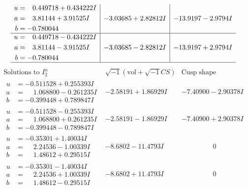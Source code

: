 \documentclass[1p]{elsarticle_modified}
\theoremstyle{definition}
\newcommand{\I}{\sqrt{-1}}
\begin{document}
$$\begin{array}{c|c|c}
\begin{aligned}
u &= \phantom{-}0.449718 + 0.434222 I \\
a &= \phantom{-}3.81144 + 3.91525 I \\
b &= -0.780044\phantom{ +0.000000I}\end{aligned}
 & -3.03685 + 2.82812 I & -13.9197 - 2.9794 I \\ \hline\begin{aligned}
u &= \phantom{-}0.449718 - 0.434222 I \\
a &= \phantom{-}3.81144 - 3.91525 I \\
b &= -0.780044\phantom{ +0.000000I}\end{aligned}
 & -3.03685 - 2.82812 I & -13.9197 + 2.9794 I\\
 \hline 
 \end{array}$$\newpage$$\begin{array}{c|c|c}  
\text{Solutions to }I^u_{2}& \I (\text{vol} + \sqrt{-1}CS) & \text{Cusp shape}\\
 \hline 
\begin{aligned}
u &= -0.511528 + 0.255393 I \\
a &= \phantom{-}1.068800 - 0.261235 I \\
b &= -0.399448 + 0.789847 I\end{aligned}
 & -2.58191 + 1.86929 I & -7.40900 - 2.90378 I \\ \hline\begin{aligned}
u &= -0.511528 - 0.255393 I \\
a &= \phantom{-}1.068800 + 0.261235 I \\
b &= -0.399448 - 0.789847 I\end{aligned}
 & -2.58191 - 1.86929 I & -7.40900 + 2.90378 I \\ \hline\begin{aligned}
u &= -0.35301 + 1.40034 I \\
a &= \phantom{-}2.24536 - 1.00339 I \\
b &= \phantom{-}1.48612 + 0.29515 I\end{aligned}
 & -8.6802 - 11.4793 I & \phantom{-0.000000 } 0 \\ \hline\begin{aligned}
u &= -0.35301 - 1.40034 I \\
a &= \phantom{-}2.24536 + 1.00339 I \\
b &= \phantom{-}1.48612 - 0.29515 I\end{aligned}
 & -8.6802 + 11.4793 I & \phantom{-0.000000 } 0 \\ \hline\begin{aligned}

\end{aligned}
\end{array}$$
\end{document}

